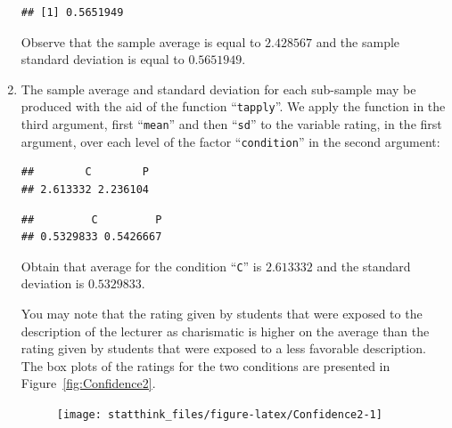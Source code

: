 \documentclass[
]{krantz}
\makeatletter
\newenvironment{Shaded}{\begin{snugshade}}{\end{snugshade}}
\newcommand{\KeywordTok}[1]{\textcolor[rgb]{0.13,0.29,0.53}{\textbf{#1}}}
\newcommand{\NormalTok}[1]{#1}
\newcommand{\OperatorTok}[1]{\textcolor[rgb]{0.81,0.36,0.00}{\textbf{#1}}}
\newenvironment{kframe}{%
\medskip{}
\setlength{\fboxsep}{.8em}
 \def\at@end@of@kframe{}%
 \ifinner\ifhmode%
  \def\at@end@of@kframe{\end{minipage}}%
  \begin{minipage}{\columnwidth}%
 \fi\fi%
 \def\FrameCommand##1{\hskip\@totalleftmargin \hskip-\fboxsep
 \colorbox{shadecolor}{##1}\hskip-\fboxsep
     \hskip-\linewidth \hskip-\@totalleftmargin \hskip\columnwidth}%
 \MakeFramed {\advance\hsize-\width
   \@totalleftmargin\z@ \linewidth\hsize
   \@setminipage}}%
 {\par\unskip\endMakeFramed%
 \at@end@of@kframe}
\renewenvironment{Shaded}{\begin{kframe}}{\end{kframe}}
\theoremstyle{definition}
\theoremstyle{definition}
\theoremstyle{definition}
\theoremstyle{remark}
\makeatother
\begin{document}
\begin{enumerate}
\begin{verbatim}
## [1] 0.5651949
\end{verbatim}

  Observe that the sample average is equal to \(2.428567\) and the sample
  standard deviation is equal to \(0.5651949\).
\item
  The sample average and standard
  deviation for each sub-sample may be produced with the aid of the
  function ``\texttt{tapply}''. We apply the function in the third argument, first
  ``\texttt{mean}'' and then ``\texttt{sd}'' to the variable rating, in the first argument,
  over each level of the factor ``\texttt{condition}'' in the second argument:

\begin{Shaded}
\end{Shaded}

\begin{verbatim}
##        C        P 
## 2.613332 2.236104
\end{verbatim}

\begin{Shaded}
\end{Shaded}

\begin{verbatim}
##         C         P 
## 0.5329833 0.5426667
\end{verbatim}

  Obtain that average for the condition ``\texttt{C}'' is \(2.613332\) and the
  standard deviation is \(0.5329833\).

  You may note that the rating given by students that were exposed to the
  description of the lecturer as charismatic is higher on the average than
  the rating given by students that were exposed to a less favorable
  description. The box plots of the ratings for the two conditions are
  presented in Figure~\ref{fig:Confidence2}.

  \begin{figure}

   {\centering \texttt{[image: statthink\_files/figure-latex/Confidence2-1]} 

}
\end{figure}
\end{enumerate}
\end{document}
